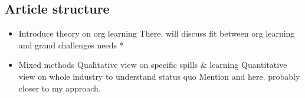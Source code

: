 	\subsection{Article structure}
	\begin{paracol}{2}
	\begin{itemize}
		\item Introduce theory on org learning
			\subitem There, will discuss fit between org learning and grand challenges needs
		\switchcolumn[0]*	
			
		\item Mixed methods
			\subitem Qualitative view on specific spills \& learning			
			\subitem Quantitative view on whole industry to understand status quo		
		\switchcolumn Mention \citet{Vergne2012} and \citet{Montgomery2019} here. \citet{Vergne2012} probably closer to my approach.
		\switchcolumn*
		
		
	\end{itemize}
	\end{paracol}
